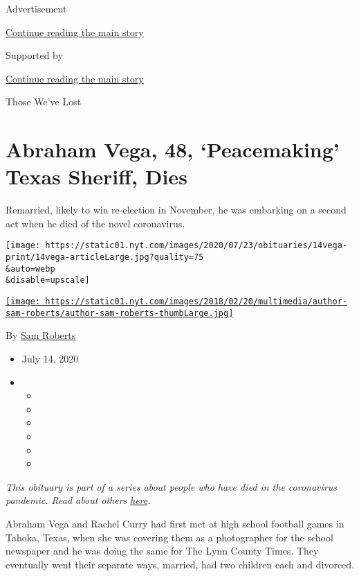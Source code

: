 Advertisement

\protect\hyperlink{after-top}{Continue reading the main story}

Supported by

\protect\hyperlink{after-sponsor}{Continue reading the main story}

Those We've Lost

\hypertarget{abraham-vega-48-peacemaking-texas-sheriff-dies}{%
\section{Abraham Vega, 48, `Peacemaking' Texas Sheriff,
Dies}\label{abraham-vega-48-peacemaking-texas-sheriff-dies}}

Remarried, likely to win re-election in November, he was embarking on a
second act when he died of the novel coronavirus.

\texttt{[image: https://static01.nyt.com/images/2020/07/23/obituaries/14vega-print/14vega-articleLarge.jpg?quality=75\\\&auto=webp\\\&disable=upscale]}

\href{https://www.nytimes.com/by/sam-roberts}{\texttt{[image: https://static01.nyt.com/images/2018/02/20/multimedia/author-sam-roberts/author-sam-roberts-thumbLarge.jpg]}}

By \href{https://www.nytimes.com/by/sam-roberts}{Sam Roberts}

\begin{itemize}
\item
  July 14, 2020
\item
  \begin{itemize}
  \item
  \item
  \item
  \item
  \item
  \item
  \end{itemize}
\end{itemize}

\emph{This obituary is part of a series about people who have died in
the coronavirus pandemic. Read about others}
\href{https://www.nytimes.com/interactive/2020/obituaries/people-died-coronavirus-obituaries.html}{\emph{here}}\emph{.}

Abraham Vega and Rachel Curry had first met at high school football
games in Tahoka, Texas, when she was covering them as a photographer for
the school newspaper and he was doing the same for The Lynn County
Times. They eventually went their separate ways, married, had two
children each and divorced.

